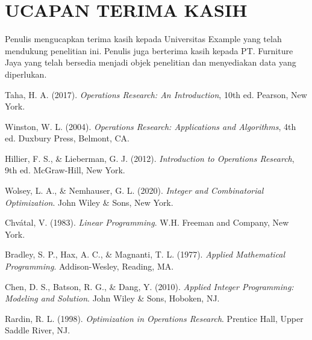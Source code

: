 \documentclass[twocolumn]{article}
\begin{document}
\section{UCAPAN TERIMA KASIH}
Penulis mengucapkan terima kasih kepada Universitas Example yang telah mendukung penelitian ini. Penulis juga berterima kasih kepada PT. Furniture Jaya yang telah bersedia menjadi objek penelitian dan menyediakan data yang diperlukan.

\begin{thebibliography}{99}
Taha, H. A. (2017). \textit{Operations Research: An Introduction}, 10th ed. Pearson, New York.

 Winston, W. L. (2004). \textit{Operations Research: Applications and Algorithms}, 4th ed. Duxbury Press, Belmont, CA.

 Hillier, F. S., \& Lieberman, G. J. (2012). \textit{Introduction to Operations Research}, 9th ed. McGraw-Hill, New York.

 Wolsey, L. A., \& Nemhauser, G. L. (2020). \textit{Integer and Combinatorial Optimization}. John Wiley \& Sons, New York.

 Chvátal, V. (1983). \textit{Linear Programming}. W.H. Freeman and Company, New York.

 Bradley, S. P., Hax, A. C., \& Magnanti, T. L. (1977). \textit{Applied Mathematical Programming}. Addison-Wesley, Reading, MA.

 Chen, D. S., Batson, R. G., \& Dang, Y. (2010). \textit{Applied Integer Programming: Modeling and Solution}. John Wiley \& Sons, Hoboken, NJ.

 Rardin, R. L. (1998). \textit{Optimization in Operations Research}. Prentice Hall, Upper Saddle River, NJ.
\end{thebibliography}
\end{document}
